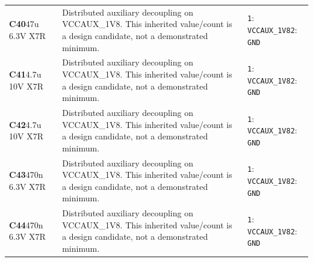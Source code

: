 \documentclass[11pt,a4paper]{article}
\begin{document}
\begin{longtable}{@{}P{27mm}P{84mm}P{57mm}@{}}
\textbf{C40}\newline 47u 6.3V X7R & Distributed auxiliary decoupling on VCCAUX\_1V8. This inherited value/count is a design candidate, not a demonstrated minimum. & \nolinkurl{1}: \nolinkurl{VCCAUX_1V8}\newline \nolinkurl{2}: \nolinkurl{GND} \\
\textbf{C41}\newline 4.7u 10V X7R & Distributed auxiliary decoupling on VCCAUX\_1V8. This inherited value/count is a design candidate, not a demonstrated minimum. & \nolinkurl{1}: \nolinkurl{VCCAUX_1V8}\newline \nolinkurl{2}: \nolinkurl{GND} \\
\textbf{C42}\newline 4.7u 10V X7R & Distributed auxiliary decoupling on VCCAUX\_1V8. This inherited value/count is a design candidate, not a demonstrated minimum. & \nolinkurl{1}: \nolinkurl{VCCAUX_1V8}\newline \nolinkurl{2}: \nolinkurl{GND} \\
\textbf{C43}\newline 470n 6.3V X7R & Distributed auxiliary decoupling on VCCAUX\_1V8. This inherited value/count is a design candidate, not a demonstrated minimum. & \nolinkurl{1}: \nolinkurl{VCCAUX_1V8}\newline \nolinkurl{2}: \nolinkurl{GND} \\
\textbf{C44}\newline 470n 6.3V X7R & Distributed auxiliary decoupling on VCCAUX\_1V8. This inherited value/count is a design candidate, not a demonstrated minimum. & \nolinkurl{1}: \nolinkurl{VCCAUX_1V8}\newline \nolinkurl{2}: \nolinkurl{GND} \\

\end{longtable}
\end{document}
